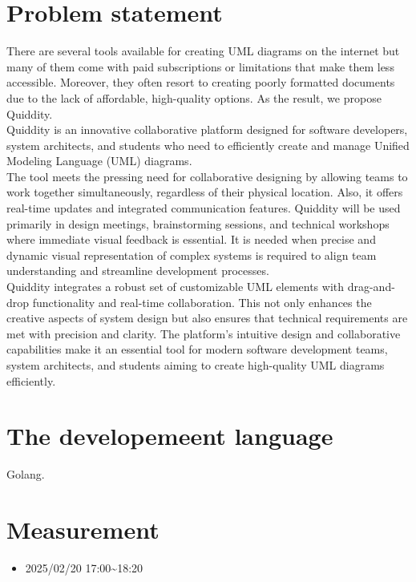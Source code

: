 \documentclass[12pt]{article}
\begin{document}
\begin{CJK*}{UTF8}{bsmi} %
\maketitlepage
\end{CJK*}

\section{Problem statement}


There are several tools available for creating UML diagrams on the internet but many of them come with paid subscriptions or limitations that make them less accessible. Moreover, they often resort to creating poorly formatted documents due to the lack of affordable, high-quality options. As the result, we propose Quiddity.\\

Quiddity is an innovative collaborative platform designed for software developers, system architects, and students who need to efficiently create and manage Unified Modeling Language (UML) diagrams.\\

The tool meets the pressing need for collaborative designing by allowing teams to work together simultaneously, regardless of their physical location. Also, it offers real-time updates and integrated communication features. Quiddity will be used primarily in design meetings, brainstorming sessions, and technical workshops where immediate visual feedback is essential. It is needed when precise and dynamic visual representation of complex systems is required to align team understanding and streamline development processes.\\

Quiddity integrates a robust set of customizable UML elements with drag-and-drop functionality and real-time collaboration. This not only enhances the creative aspects of system design but also ensures that technical requirements are met with precision and clarity. The platform's intuitive design and collaborative capabilities make it an essential tool for modern software development teams, system architects, and students aiming to create high-quality UML diagrams efficiently.

\section{The developemeent language}
Golang.

\section{Measurement}
    
\begin{itemize}
  \item{2025/02/20 17:00\textasciitilde18:20}
\end{itemize}


\nocite{Siepe2024}
\printbibliography[heading=none]
\end{document}
